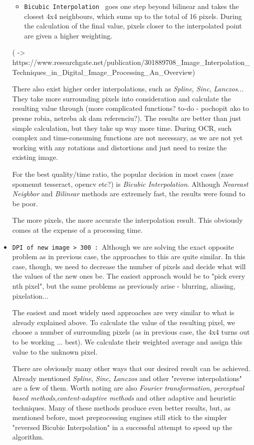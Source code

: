 \begin{itemize}
\begin{itemize}
\item\texttt {Bicubic Interpolation } goes one step beyond bilinear and takes the closest 4x4 neighbours, which sums up to the total of 16 pixels. During the calculation of the final value, pixels closer to the interpolated point are given a higher weighting.

\end{itemize}

( -> https://www.researchgate.net/publication/301889708_Image_Interpolation_Techniques_in_Digital_Image_Processing_An_Overview)

There also exist higher order interpolations, such as \emph{Spline}, \emph{Sinc}, \emph{Lanczos}... They take more surrounding pixels into consideration and calculate the resulting value through (more complicated functions? to-do - pochopit ako to presne robia, netreba ak dam referenciu?). The results are better than just simple calculation, but they take up way more time. During OCR, such complex and time-consuming functions are not necessary, as we are not yet working with any rotations and distortions and just need to resize the existing image.

For the best quality/time ratio, the popular decision in most cases (zase spomenut tesseract, opencv etc?) is \emph{Bicubic Interpolation}. Although \emph{Neareast Neighbor} and \emph{Bilinear} methods are extremely fast, the results were found to be poor.

The more pixels, the more accurate the interpolation result. This obviously comes at the expense of a processing time.

\item\texttt {DPI of new image > 300 : }Although we are solving the exact opposite problem as in previous case, the approaches to this are quite similar. In this case, though, we need to decrease the number of pixels and decide what will the values of the new ones be. The easiest approach would be to "pick every nth pixel", but the same problems as previously arise - blurring, aliasing, pixelation...

The easiest and most widely used approaches are very similar to what is already explained above. To calculate the value of the resulting pixel, we choose a number of surrounding pixels (as in previous case, the 4x4 turns out to be working ... best). We calculate their weighted average and assign this value to the unknown pixel.

There are obviously many other ways that our desired result can be achieved. Already mentioned \emph{Spline}, \emph{Sinc}, \emph{Lanczos} and other "reverse interpolations" are a few of them. Worth noting are also \emph{Fourier transformation}, \emph{perceptual based methods},\emph{content-adaptive methods} and other adaptive and heuristic techniques.
Many of these methods produce even better results, but, as mentioned before, most preprocessing engines still stick to the simpler "reversed Bicubic Interpolation" in a successful attempt to speed up the algorithm.

\end{itemize}

